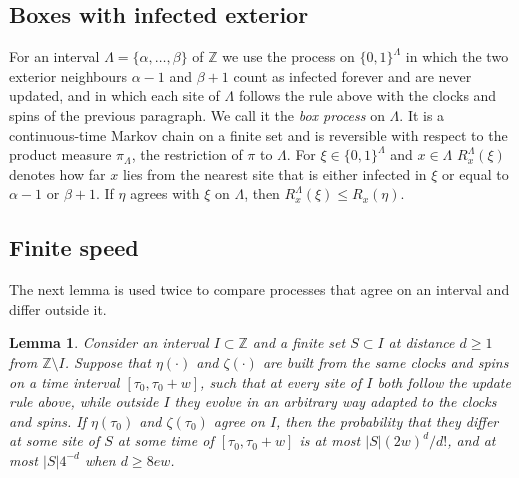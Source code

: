 \documentclass[11pt]{amsart}
\newtheorem{lemma}[theorem]{Lemma}
\theoremstyle{definition}
\theoremstyle{remark}
\newcommand{\Z}{\mathbb{Z}}
\begin{document}
\subsection{Boxes with infected exterior}
For an interval $\Lambda=\{\alpha,\dots,\beta\}$ of $\Z$ we use the process on $\{0,1\}^\Lambda$ in which the two exterior
neighbours $\alpha-1$ and $\beta+1$ count as infected forever and are never updated, and in which each site of $\Lambda$ follows the
rule above with the clocks and spins of the previous paragraph. We call it the \emph{box process} on $\Lambda$. It is a
continuous-time Markov chain on a finite set and is reversible with respect to the product measure $\pi_\Lambda$, the
restriction of $\pi$ to $\Lambda$. For $\xi\in\{0,1\}^\Lambda$ and $x\in\Lambda$ $R^\Lambda_x(\xi)$ denotes how far $x$
lies from the nearest site that is either infected in $\xi$ or equal to $\alpha-1$ or $\beta+1$. If $\eta$ agrees with
$\xi$ on $\Lambda$, then $R^\Lambda_x(\xi)\le R_x(\eta)$.

\subsection{Finite speed}
The next lemma is used twice to compare processes that agree on an interval and differ outside it.

\begin{lemma}\label{lem:speed}
Consider an interval $I\subset\Z$ and a finite set $S\subset I$ at distance $d\ge1$ from $\Z\setminus I$. Suppose that
$\eta(\cdot)$ and $\zeta(\cdot)$ are built from the same clocks and spins on a time interval $[\tau_0,\tau_0+w]$, such that
at every site of $I$ both follow the update rule above, while outside $I$ they evolve in an arbitrary way adapted to the
clocks and spins. If $\eta(\tau_0)$ and $\zeta(\tau_0)$ agree on $I$, then the probability that they differ at some site
of $S$ at some time of $[\tau_0,\tau_0+w]$ is at most $|S|(2w)^d/d!$, and at most $|S|4^{-d}$ when $d\ge8ew$.
\end{lemma}
\end{document}
